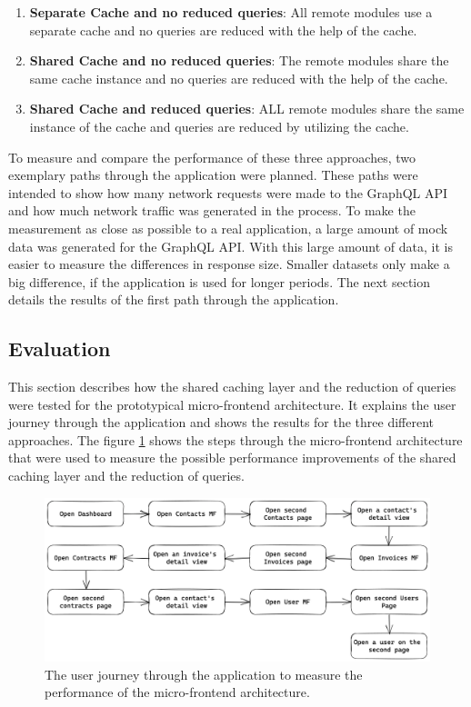 \begin{enumerate}
  \item \textbf{Separate Cache and no reduced queries}: All remote modules use a separate cache and no queries are reduced with the help of the cache.
  \item \textbf{Shared Cache and no reduced queries}: The remote modules share the same cache instance and no queries are reduced with the help of the cache.
  \item \textbf{Shared Cache and reduced queries}: ALL remote modules share the same instance of the cache and queries are reduced by utilizing the cache.
\end{enumerate}

\noindent To measure and compare the performance of these three approaches, two exemplary paths through the application were planned. These paths were intended to show how many network requests were made to the GraphQL \ac{API} and how much network traffic was generated in the process. To make the measurement as close as possible to a real application, a large amount of mock data was generated for the GraphQL \ac{API}. With this large amount of data, it is easier to measure the differences in response size. Smaller datasets only make a big difference, if the application is used for longer periods. The next section details the results of the first path through the application.

\subsection{Evaluation}

This section describes how the shared caching layer and the reduction of queries were tested for the prototypical micro-frontend architecture. It explains the user journey through the application and shows the results for the three different approaches. The figure \ref{fig:results:evaluation-path} shows the steps through the micro-frontend architecture that were used to measure the possible performance improvements of the shared caching layer and the reduction of queries.

\ifshowImages
\begin{figure}[H]
\centering
\includegraphics[width=1\linewidth]{images/results/evaluation-path.png}
\caption{The user journey through the application to measure the performance of the micro-frontend architecture.}\label{fig:results:evaluation-path}
\end{figure}
\fi

